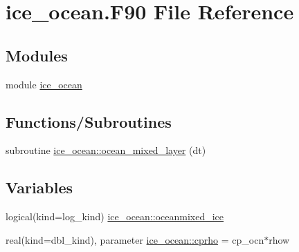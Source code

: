 \hypertarget{ice__ocean_8F90}{
\section{ice\_\-ocean.F90 File Reference}
\label{ice__ocean_8F90}
}
\subsection*{Modules}
\begin{DoxyCompactItemize}
\item 
module \hyperlink{namespaceice__ocean}{ice\_\-ocean}
\end{DoxyCompactItemize}
\subsection*{Functions/Subroutines}
\begin{DoxyCompactItemize}
\item 
subroutine \hyperlink{namespaceice__ocean_af0be25ef3889c1d787ab627860f0ce4c}{ice\_\-ocean::ocean\_\-mixed\_\-layer} (dt)
\end{DoxyCompactItemize}
\subsection*{Variables}
\begin{DoxyCompactItemize}
\item 
logical(kind=log\_\-kind) \hyperlink{namespaceice__ocean_ac7a4a91716b2a7a7aa7429576cb4375b}{ice\_\-ocean::oceanmixed\_\-ice}
\item 
real(kind=dbl\_\-kind), parameter \hyperlink{namespaceice__ocean_ae3c9a8abe47f32814e333bc76fca8735}{ice\_\-ocean::cprho} = cp\_\-ocn$\ast$rhow
\end{DoxyCompactItemize}
